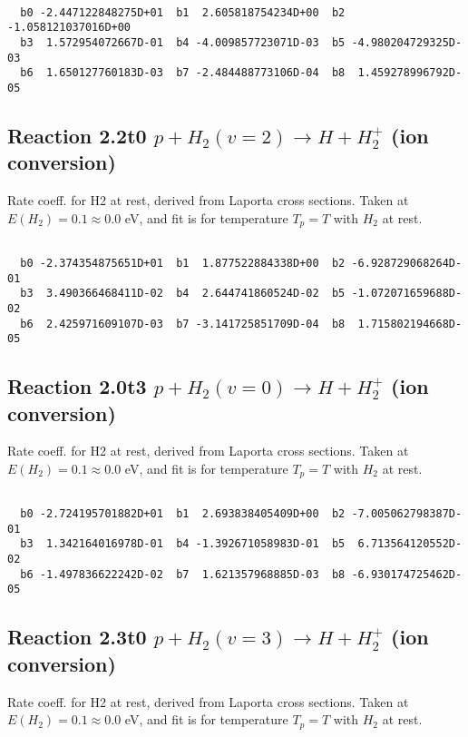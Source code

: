 \begin{small}\begin{verbatim}

  b0 -2.447122848275D+01  b1  2.605818754234D+00  b2 -1.058121037016D+00
  b3  1.572954072667D-01  b4 -4.009857723071D-03  b5 -4.980204729325D-03
  b6  1.650127760183D-03  b7 -2.484488773106D-04  b8  1.459278996792D-05

\end{verbatim}\end{small}

\newpage
\subsection{
Reaction 2.2t0
$ p + H_2(v=2) \rightarrow H + H_2^+$ (ion conversion)
}
Rate coeff. for H2 at rest, derived from Laporta cross sections.
Taken at $E(H_2) = 0.1 \approx 0.0$ eV,  and fit is for temperature $T_p=T$ with $H_2$ at rest.

\begin{small}\begin{verbatim}

  b0 -2.374354875651D+01  b1  1.877522884338D+00  b2 -6.928729068264D-01
  b3  3.490366468411D-02  b4  2.644741860524D-02  b5 -1.072071659688D-02
  b6  2.425971609107D-03  b7 -3.141725851709D-04  b8  1.715802194668D-05

\end{verbatim}\end{small}

\newpage
\subsection{
Reaction 2.0t3
$ p + H_2(v=0) \rightarrow H + H_2^+$ (ion conversion)
}
Rate coeff. for H2 at rest, derived from Laporta cross sections.
Taken at $E(H_2) = 0.1 \approx 0.0$ eV,  and fit is for temperature $T_p=T$ with $H_2$ at rest.

\begin{small}\begin{verbatim}

  b0 -2.724195701882D+01  b1  2.693838405409D+00  b2 -7.005062798387D-01
  b3  1.342164016978D-01  b4 -1.392671058983D-01  b5  6.713564120552D-02
  b6 -1.497836622242D-02  b7  1.621357968885D-03  b8 -6.930174725462D-05

\end{verbatim}\end{small}

\newpage
\subsection{
Reaction 2.3t0
$ p + H_2(v=3) \rightarrow H + H_2^+$ (ion conversion)
}
Rate coeff. for H2 at rest, derived from Laporta cross sections.
Taken at $E(H_2) = 0.1 \approx 0.0$ eV,  and fit is for temperature $T_p=T$ with $H_2$ at rest.

